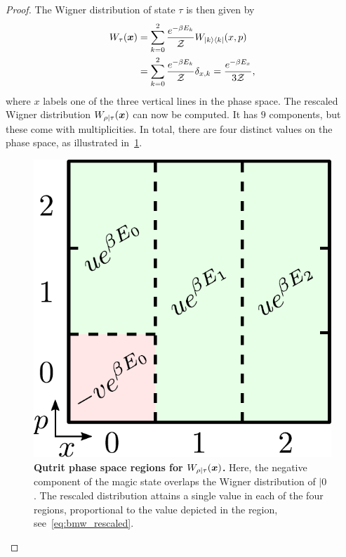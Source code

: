 \documentclass[pra,
aps,
twocolumn,
superscriptaddress,
groupedaddress,
nofootinbib,
reprint
]{revtex4-1}
\begin{document}
\begin{proof}
The Wigner distribution of state $\tau$ is then given by
\begin{align}
	\W[\bmx]{\tau} &= \sum\limits_{k=0}^2 \frac{e^{-\beta E_k}}{\Z}W_{|k\>\<k|}(x, p) \nonumber\\
	&= \sum\limits_{k=0}^2 \frac{e^{-\beta E_k}}{\Z} \delta_{x, k} = \frac{e^{-\beta E_x}}{3\Z},
\end{align}
where $x$ labels one of the three vertical lines in the phase space.
The rescaled Wigner distribution $W_{\rho|\tau}(\boldsymbol{x})$ can now be computed. It has $9$ components, but these come with multiplicities. In total, there are four distinct values on the phase space, as illustrated in~\cref{fig:pd_split}.
\begin{figure}[h]
    \centering
    \includegraphics[scale=0.45]{figs/pd_split_thermal.pdf}
    \caption{\textbf{Qutrit phase space regions for $W_{\rho | \tau}(\boldsymbol{x})$.}
    Here, the negative component of the magic state overlaps the Wigner distribution of $|0\>$. The rescaled distribution attains a single value in each of the four regions, proportional to the value depicted in the region, see~\cref{eq:bmw_rescaled}.
    }
    \label{fig:pd_split}
\end{figure}


\end{proof}
\end{document}
